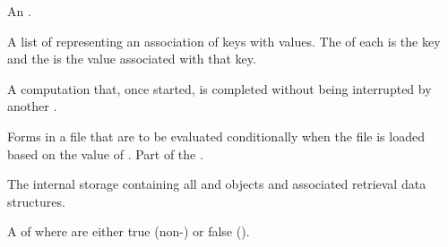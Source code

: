 
\begin{glossary-list}
  
  
\glent[alist]
%
%
An .


%
%
A list of  representing an association of keys with values. The
 of each  is the key and the  is the value
associated with that key.


%
%
A computation that, once started, is completed without being interrupted by
another .


%
%
Forms in a  file that are to be evaluated conditionally when the
file is loaded based on the value of \textbf{}.
Part of the .


%
%
The internal storage containing all  and
 objects and associated retrieval data structures.


%
%
%
%
A  of   where
  are either true (non-\nil) or
false (\nil).



\end{glossary-list}
